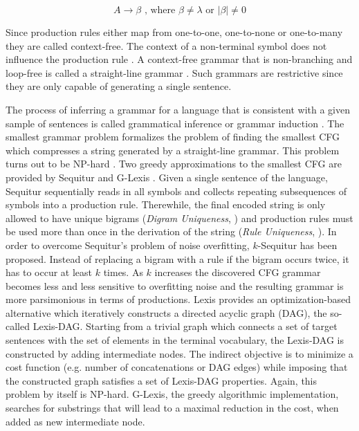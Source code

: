 \documentclass[colorinlistoftodos]{article}
\theoremstyle{definition}
\begin{document}
 \vspace{-0.25cm}
 $$A \to \beta \text{  , where   } \beta \neq \lambda \text{   or  } |\beta| \neq 0$$
 
 Since production rules either map from one-to-one, one-to-none or one-to-many they are called context-free. The context of a non-terminal symbol does not influence the production rule \citep{Pastra_2012}.
A context-free grammar that is non-branching and loop-free is called a straight-line grammar \citep{Siyari_2016}. Such grammars are restrictive since they are only capable of generating a single sentence.

The process of inferring a grammar for a language that is consistent with a given sample of sentences is called grammatical inference or grammar induction \citep{Levelt_2008}. The smallest grammar problem \citep{Charikar_2005, Siyari_2016} formalizes the problem of finding the smallest CFG which compresses a string generated by a straight-line grammar. This problem turns out to be NP-hard \citep{Charikar_2005}. Two greedy approximations to the smallest CFG are provided by Sequitur \citep{Manning_1997} and G-Lexis \citep{Siyari_2016b}.
Given a single sentence of the language, Sequitur sequentially reads in all symbols and collects repeating subsequences of symbols into a production rule. Therewhile, the final encoded string is only allowed to have unique bigrams (\textit{Digram Uniqueness}, \citep{Manning_1997}) and production rules must be used more than once in the derivation of the string (\textit{Rule Uniqueness}, \citep{Manning_1997}).
In order to overcome Sequitur's problem of noise overfitting, $k$-Sequitur \citep{Stout_2018} has been proposed. Instead of replacing a bigram with a rule if the bigram occurs twice, it has to occur at least $k$ times. As $k$ increases the discovered CFG grammar becomes less and less sensitive to overfitting noise and the resulting grammar is more parsimonious in terms of productions. 
Lexis \citep{Siyari_2016b} provides an optimization-based alternative which iteratively constructs a directed acyclic graph (DAG), the so-called Lexis-DAG. Starting from a trivial graph which connects a set of target sentences with the set of elements in the terminal vocabulary, the Lexis-DAG is constructed by adding intermediate nodes. The indirect objective is to minimize a cost function (e.g. number of concatenations or DAG edges) while imposing that the constructed graph satisfies a set of Lexis-DAG properties. Again, this problem by itself is NP-hard. G-Lexis, the greedy algorithmic implementation, searches for substrings that will lead to a maximal reduction in the cost, when added as new intermediate node.
\end{document}
